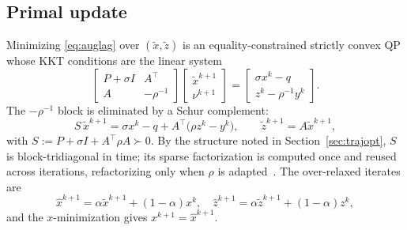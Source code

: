 \documentclass[10pt,twocolumn]{article}
\begin{document}
\subsection{Primal update}
Minimizing \eqref{eq:auglag} over $(\tilde x,\tilde z)$ is an equality-constrained
strictly convex QP whose KKT conditions are the linear
system~\cite[Eq.~(7)]{turbompc}
\begin{equation}
\label{eq:primal}
\begin{bmatrix} P+\sigma I & A^\top\\ A & -\rho^{-1}\end{bmatrix}
\begin{bmatrix}\tilde x^{k+1}\\ \nu^{k+1}\end{bmatrix}
=
\begin{bmatrix}\sigma x^{k} - q\\ z^{k} - \rho^{-1}y^{k}\end{bmatrix}.
\end{equation}
The $-\rho^{-1}$ block is eliminated by a Schur complement:
\begin{equation}
\label{eq:schur}
S\,\tilde x^{k+1} = \sigma x^{k} - q + A^\top\!\bigl(\rho z^{k} - y^{k}\bigr),
\qquad \tilde z^{k+1} = A\tilde x^{k+1},
\end{equation}
with $S := P + \sigma I + A^\top\!\rho A \succ 0$. By the structure noted in
Section~\ref{sec:trajopt}, $S$ is block-tridiagonal in time; its sparse
factorization is computed once and reused across iterations, refactorizing only when
$\rho$ is adapted~\cite{turbompc,osqp}. The over-relaxed iterates are
\begin{equation}
\label{eq:overrelax}
\hat x^{k+1} = \alpha\tilde x^{k+1} + (1-\alpha)x^{k},\quad
\hat z^{k+1} = \alpha\tilde z^{k+1} + (1-\alpha)z^{k},
\end{equation}
and the $x$-minimization gives $x^{k+1} = \hat x^{k+1}$.
\end{document}
